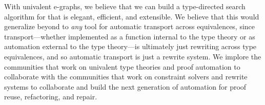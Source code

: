 With univalent e-graphs, we believe that we can build a type-directed search algorithm for 
\toolname that is elegant, efficient, and extensible.
We believe that this would generalize beyond \toolname to \textit{any} tool
for automatic transport across equivalences, since transport---whether implemented as a function internal to the
type theory or as automation external to the type theory---is ultimately just rewriting across type equivalences,
and so automatic transport is just a rewrite system.
We implore the communities that work on univalent type theories and proof automation to collaborate with
the communities that work on constraint solvers and rewrite systems to collaborate and build
the next generation of automation for proof reuse, refactoring, and repair.


